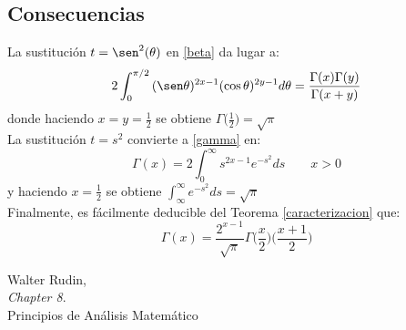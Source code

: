 \documentclass[a4paper, 11pt]{amsart}
\theoremstyle{definition}
\theoremstyle{remark}
\numberwithin{equation}{section}
\begin{document}
  \subsection{Consecuencias}
  La sustitución $t=\sen^2(\theta)$ en \ref{beta} da lugar a:
  \begin{equation}
   2\int_0^{\pi/2}{(\sen\theta)^{2x-1}(\cos\theta)^{2y-1}d\theta} = \frac{\Gamma(x)\Gamma(y)}{\Gamma(x+y)}
  \end{equation}
  donde haciendo $x=y=\frac{1}{2}$ se obtiene $\Gamma\bigg(\frac{1}{2}\bigg) = \sqrt{\pi}$\\
  
  La sustitución $t=s^2$ convierte a \ref{gamma} en:
  \begin{equation}
   \Gamma(x) = 2\int_0^\infty s^{2x-1}e^{-s^2}ds \qquad x>0
  \end{equation}
  y haciendo $x=\frac{1}{2}$ se obtiene $\int_{\infty}^{\infty} e^{-s^2}ds = \sqrt{\pi}$\\
  
  Finalmente, es fácilmente deducible del Teorema \ref{caracterizacion} que:
  \begin{equation}
   \Gamma(x)= \frac{2^{x-1}}{\sqrt{\pi}}\Gamma\bigg(\frac{x}{2}\bigg)\bigg(\frac{x+1}{2}\bigg)
  \end{equation}


  

  
  \newpage
  \begin{thebibliography}{9}

    Walter Rudin,\\
    \emph{Chapter 8}.\\
    Principios de Análisis Matemático
    
  \end{thebibliography}

  
\end{document}
